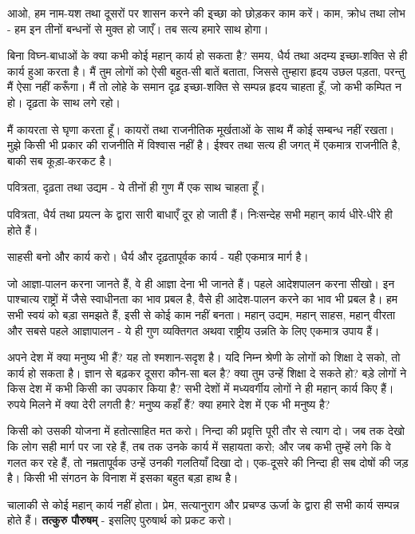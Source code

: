 आओ, हम नाम-यश तथा दूसरों पर शासन करने की इ्च्छा को छोड़कर काम करें। काम, क्रोध तथा लोभ - हम इन तीनों बन्धनों से मुक्त हो जाएँ। तब सत्य हमारे साथ होगा। 

बिना विघ्न-बाधाओं के क्या कभी कोई महान् कार्य हो सकता है? समय, धैर्य तथा अदम्य इच्छा-शक्ति से ही कार्य हुआ करता है। मैं तुम लोगों को ऐसी बहुत-सी बातें बताता, जिससे तुम्हारा हृदय उछल पड़ता, परन्तु मैं ऐसा नहीं करूँगा। मैं तो लोहे के समान दृढ़ इच्छा-शक्ति से सम्पन्न हृदय चाहता हूँ, जो कभी कम्पित न हो। दृढ़ता के साथ लगे रहो। 

मैं कायरता से घृणा करता हूँ। कायरों तथा राजनीतिक मूर्खताओं के साथ मैं कोई सम्बन्ध नहीं रखता। मुझे किसी भी प्रकार की राजनीति में विश्वास नहीं है। ईश्वर तथा सत्य ही जगत् में एकमात्र राजनीति है, बाकी सब कूड़ा-करकट है। 

पवित्रता, दृढ़ता तथा उद्यम - ये तीनों ही गुण मैं एक साथ चाहता हूँ। 

पवित्रता, धैर्य तथा प्रयत्न के द्वारा सारी बाधाएँ दूर हो जाती हैं। निःसन्देह सभी महान् कार्य धीरे-धीरे ही होते हैं। 

साहसी बनो और कार्य करो। धैर्य और दृढ़तापूर्वक कार्य - यही एकमात्र मार्ग है। 

जो आज्ञा-पालन करना जानते हैं, वे ही आज्ञा देना भी जानते हैं। पहले आदेशपालन करना सीखो। इन पाश्चात्य राष्ट्रों में जैसे स्वाधीनता का भाव प्रबल है, वैसे ही आदेश-पालन करने का भाव भी प्रबल है। हम सभी स्वयं को बड़ा समझते हैं, इसी से कोई काम नहीं बनता। महान् उद्यम, महान् साहस, महान् वीरता और सबसे पहले आज्ञापालन - ये ही गुण व्यक्तिगत अथवा राष्ट्रीय उन्नति के लिए एकमात्र उपाय हैं। 

अपने देश में क्या मनुष्य भी हैं? यह तो श्मशान-सदृश है। यदि निम्न श्रेणी के लोगों को शिक्षा दे सको, तो कार्य हो सकता है। ज्ञान से बढ़कर दूसरा कौन-सा बल है? क्या तुम उन्हें शिक्षा दे सकते हो? बड़े लोगों ने किस देश में कभी किसी का उपकार किया है? सभी देशों में मध्यवर्गीय लोगों ने ही महान् कार्य किए हैं। रुपये मिलने में क्या देरी लगती है? मनुष्य कहाँ हैं? क्या हमारे देश में एक भी मनुष्य है? 

किसी को उसकी योजना में हतोत्साहित मत करो। निन्दा की प्रवृत्ति पूरी तौर से त्याग दो। जब तक देखो कि लोग सही मार्ग पर जा रहे हैं, तब तक उनके कार्य में सहायता करो; और जब कभी तुम्हें लगे कि वे गलत कर रहे हैं, तो नम्रतापूर्वक उन्हें उनकी गलतियाँ दिखा दो। एक-दूसरे की निन्दा ही सब दोषों की जड़ है। किसी भी संगठन के विनाश में इसका बहुत बड़ा हाथ है। 

चालाकी से कोई महान् कार्य नहीं होता। प्रेम, सत्यानुराग और प्रचण्ड ऊर्जा के द्वारा ही सभी कार्य सम्पन्न होते हैं। \textbf{तत्कुरु पौरुषम् } - इसलिए पुरुषार्थ को प्रकट करो। 

